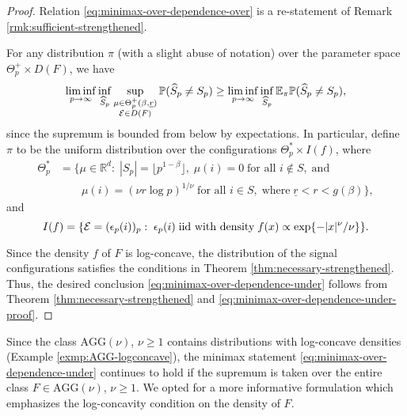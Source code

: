 \begin{proof}%
Relation \eqref{eq:minimax-over-dependence-over} is a re-statement of Remark \ref{rmk:sufficient-strengthened}.

For any distribution $\pi$ (with a slight abuse of notation) over the parameter space $\Theta_p^+\times D(F)$, we have
\begin{equation} \label{eq:minimax-over-dependence-under-proof}
    \liminf_{p\to\infty} \inf_{\widehat{S}_p} \sup_{\substack{\mu\in\Theta_p^+(\beta, \underline{r})\\ {\cal E}\in D(F)}} {\mathbb P}(\widehat{S}_p \neq S_p) 
\ge \liminf_{p\to\infty} \inf_{\widehat{S}_p} {\mathbb E}_{\pi} {\mathbb P}(\widehat{S}_p \neq S_p),
\end{equation}
since the supremum is bounded from below by expectations.
In particular, define $\pi$ to be the uniform distribution over the configurations $\Theta_p^*\times I(f)$, where
\begin{align*}
    \Theta_p^* &=
    \{\mu\in\mathbb{R}^d:\;|S_p|=\lfloor p^{1-\beta}\rfloor,\;\mu(i)=0\;\text{for all }i\not\in S, \;\text{and}\\
    &\quad\quad\mu(i) = (\nu{r}\log{p})^{1/\nu}\;\text{for all }i\in S,\;\text{where}\;\underline{r}<r<g(\beta)\},
\end{align*}
and 
\begin{equation*}
    I(f)=\{{\cal E}=(\epsilon_p(i))_p:\;\epsilon_p(i)\;\text{iid with density}\; f(x)\propto \exp\{-|x|^\nu/\nu\}\}.
\end{equation*}

Since the density $f$ of $F$ is log-concave, the distribution of the signal configurations satisfies the conditions in Theorem \ref{thm:necessary-strengthened}.
Thus, the desired conclusion \eqref{eq:minimax-over-dependence-under} follows from Theorem \ref{thm:necessary-strengthened} and \eqref{eq:minimax-over-dependence-under-proof}.
\end{proof}

\begin{remark}
Since the class $\text{AGG}(\nu)$, $\nu\ge1$ contains distributions with log-concave densities (Example \ref{exmp:AGG-logconcave}), the minimax statement \eqref{eq:minimax-over-dependence-under} continues to hold if the supremum is taken over the entire class $F\in\text{AGG}(\nu)$, $\nu\ge1$.
We opted for a more informative formulation which emphasizes the log-concavity condition on the density of $F$.
\end{remark}

